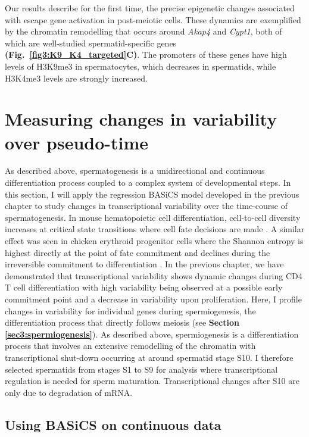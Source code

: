 Our results describe for the first time, the precise epigenetic changes associated with escape gene activation in post-meiotic cells. These dynamics are exemplified by the chromatin remodelling that occurs around \textit{Akap4} and \textit{Cypt1}, both of which are well-studied spermatid-specific genes \textbf{(Fig.~\ref{fig3:K9_K4_targeted}C)}. The promoters of these genes have high levels of H3K9me3 in spermatocytes, which decreases in spermatids, while H3K4me3 levels are strongly increased. 

\section{Measuring changes in variability over pseudo-time}

As described above, spermatogenesis is a unidirectional and continuous differentiation process coupled to a complex system of developmental steps. In this section, I will apply the regression BASiCS model developed in the previous chapter to study changes in transcriptional variability over the time-course of spermatogenesis. In mouse hematopoietic cell differentiation,  cell-to-cell diversity increases at critical state transitions where cell fate decisions are made \citep{Mojtahedi2016}. A similar effect was seen in chicken erythroid progenitor cells where the Shannon entropy is highest directly at the point of fate commitment and declines during the irreversible commitment to differentiation \cite{Richard2016}. In the previous chapter, we have demonstrated that transcriptional variability shows dynamic changes during CD4\plus{} T cell differentiation with high variability being observed at a possible early commitment point and a decrease in variability upon proliferation. Here, I profile changes in variability for individual genes during spermiogenesis, the differentiation process that directly follows meiosis (see \textbf{Section \ref{sec3:spermiogenesis}}). As described above, spermiogenesis is a differentiation process that involves an extensive remodelling of the chromatin with transcriptional shut-down occurring at around spermatid stage S10. I therefore selected spermatids from stages S1 to S9 for analysis where transcriptional regulation is needed for sperm maturation. Transcriptional changes after S10 are only due to degradation of mRNA. 

\subsection{Using BASiCS on continuous data}

